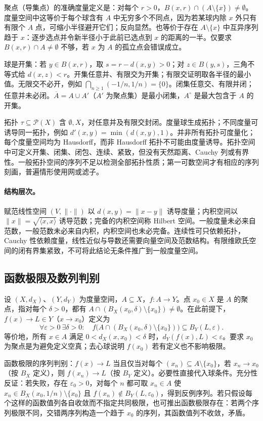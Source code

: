 \documentclass[11pt,a4paper,UTF8]{ctexart}
\theoremstyle{definition}\newtheorem{definition}[theorem]{定义}
\theoremstyle{remark}\newtheorem{remark}[theorem]{说明}
\begin{document}
聚点（导集点）的准确度量定义是：对每个 $r>0$，$B(x,r)\cap(A\setminus\{x\})\ne\emptyset$。度量空间中这等价于每个球含有 $A$ 中无穷多个不同点，因为若某球内除 $x$ 外只有有限个 $A$ 点，可缩小半径避开它们；反向显然。也等价于存在 $A\setminus\{x\}$ 中互异序列趋于 $x$：逐步选点并令新半径小于此前已选点到 $x$ 的距离的一半。仅要求 $B(x,r)\cap A\ne\emptyset$ 不够，若 $x$ 为 $A$ 的孤立点会错误成立。

球是开集：若 $y\in B(x,r)$，取 $s=r-d(x,y)>0$；对 $z\in B(y,s)$，三角不等式给 $d(x,z)<r$。开集任意并、有限交为开集；有限交证明取各半径的最小值。无限交不必开，例如 $\bigcap_{n\ge1}(-1/n,1/n)=\{0\}$。闭集任意交、有限并闭；任意并未必闭。$\overline A=A\cup A'$（$A'$ 为聚点集）是最小闭集，$A^\circ$ 是最大包含于 $A$ 的开集。

拓扑 $\tau\subseteq\mathcal P(X)$ 含 $\emptyset,X$，对任意并及有限交封闭。度量球生成拓扑；不同度量可诱导同一拓扑，例如 $d'(x,y)=\min(d(x,y),1)$。并非所有拓扑可度量化；每个度量空间均为 Hausdorff，而非 Hausdorff 拓扑不可能由度量诱导。拓扑空间中可定义开集、闭集、闭包、连续、紧致，但没有天然距离、Cauchy 列或有界性。一般拓扑空间的序列不足以检测全部拓扑性质；第一可数空间才有相应的序列刻画，普遍情形使用网或滤子。

\paragraph{结构层次。} 赋范线性空间 $(V,\|\cdot\|)$ 以 $d(x,y)=\|x-y\|$ 诱导度量；内积空间以 $\|x\|=\sqrt{\langle x,x\rangle}$ 诱导范数；完备的内积空间称 Hilbert 空间。一般度量未必来自范数，一般范数未必来自内积，内积空间也未必完备。连续性可只依赖拓扑，Cauchy 性依赖度量，线性近似与导数还需要向量空间及范数结构。有限维欧氏空间的闭有界集紧致，不可将此结论无条件推广到一般度量空间。

\subsection{函数极限及数列判别}
设 $(X,d_X)$、$(Y,d_Y)$ 为度量空间，$A\subseteq X$，$f:A\to Y$。点 $x_0\in X$ 是 $A$ 的聚点，指对每个 $\delta>0$，都有 $A\cap(B_X(x_0,\delta)\setminus\{x_0\})\ne\emptyset$。在此前提下，$f(x)\to L\in Y$（$x\to x_0$）定义为
\[
\forall\varepsilon>0\ \exists\delta>0:\quad
f\bigl(A\cap(B_X(x_0,\delta)\setminus\{x_0\})\bigr)\subseteq B_Y(L,\varepsilon).
\]
等价地，所有 $x\in A$ 满足 $0<d_X(x,x_0)<\delta$ 时，$d_Y(f(x),L)<\varepsilon$。要求 $x_0$ 为聚点是为避免定义空真；去心球说明 $f(x_0)$ 若有定义也不影响极限。

函数极限的序列判别：$f(x)\to L$ 当且仅当对每个 $(x_n)\subseteq A\setminus\{x_0\}$，若 $x_n\to x_0$（按 $B_X$ 定义），则 $f(x_n)\to L$（按 $B_Y$ 定义）。必要性直接代入球条件。充分性反证：若失败，存在 $\varepsilon_0>0$，对每个 $n$ 都可取 $x_n\in A$ 使 $x_n\in B_X(x_0,1/n)\setminus\{x_0\}$ 且 $f(x_n)\notin B_Y(L,\varepsilon_0)$，得到反例序列。若只假设每个这样的函数值列各自收敛而不指定共同极限，也可推出函数极限存在：若两个序列极限不同，交错两序列构造一个趋于 $x_0$ 的序列，其函数值列不收敛，矛盾。
\end{document}
